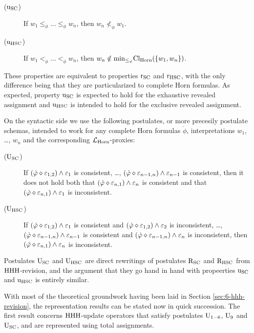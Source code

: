 \begin{description}
	\item[($\mathrm{u}_{{\mathrm{SC}}}$)] If $w_1 \le_{\dot{\phi}}\dots \le_{\dot{\phi}}w_n$,
	then $w_{n}\not<_{\dot{\phi}} w_{1}$.
	\item[($\mathrm{u}_{{\mathrm{HSC}}}$)] If $w_1 <_{\dot{\phi}}\dots <_{\dot{\phi}} w_n$,
	then $w_n\notin{\operatorname{min}}_{\le_{\dot{\varphi}}}{\operatorname{Cl}}_{\mathrm{Horn}}(\{w_1,w_n\})$.
\end{description}

These properties are equivalent to properties $\mathrm{r}_{{\mathrm{SC}}}$ and $\mathrm{r}_{{\mathrm{HSC}}}$,
with the only difference being that they are particularized to complete Horn formulas.
As expected, property $\mathrm{u}_{{\mathrm{SC}}}$ is expected to hold for the exhaustive 
revealed assignment and $\mathrm{u}_{{\mathrm{HSC}}}$ is intended to hold for the exclusive 
revealed assignment.

On the syntactic side 
we use the following postulates,
or more precesily postulate schemas,
intended to work for any complete Horn formulas $\dot{\phi}$,
interpretations $w_1$, \dots, $w_n$
and the corresponding $\mathcal{L}_{\mathrm{Horn}}$-proxies:

\begin{description}
	\item[($\mathrm{U}_{{\mathrm{SC}}}$)]
	If $(\dot{\varphi}\diamond\varepsilon_{1,2})\land\varepsilon_{1}$ is consistent,
		\dots,
		$(\dot{\varphi}\diamond\varepsilon_{n-1,n})\land\varepsilon_{n-1}$ is consistent,
	then it does not hold both that
	$(\dot{\varphi}\diamond\varepsilon_{n,1})\land\varepsilon_{n}$ is consistent
	and that $(\dot{\varphi}\diamond\varepsilon_{n,1})\land\varepsilon_{1}$ is inconsistent.

	\item[($\mathrm{U}_{{\mathrm{HSC}}}$)]
	If 
		$(\dot{\varphi}\diamond\varepsilon_{1,2})\land\varepsilon_{1}$ is consistent and
		$(\dot{\varphi}\diamond\varepsilon_{1,2})\land\varepsilon_{2}$ is inconsistent,
		\dots,
		$(\dot{\varphi}\diamond\varepsilon_{n-1,n})\land\varepsilon_{n-1}$ is consistent and
		$(\dot{\varphi}\diamond\varepsilon_{n-1,n})\land\varepsilon_{n}$ is inconsistent,
	then $(\dot{\varphi}\diamond\varepsilon_{n,1})\land\varepsilon_{n}$ is inconsistent.
\end{description}

Postulates $\mathrm{U}_{{\mathrm{SC}}}$ and $\mathrm{U}_{{\mathrm{HSC}}}$ are direct rewritings of postulates 
$\mathrm{R}_{{\mathrm{SC}}}$ and $\mathrm{R}_{{\mathrm{HSC}}}$ from ${\mathrm{HHH}}$-revision,
and the argument that they go hand in hand with propeerties $\mathrm{u}_{{\mathrm{SC}}}$ and $\mathrm{u}_{{\mathrm{HSC}}}$
is entirely similar.

With most of the theoretical groundwork having been laid in Section \ref{sec:6-hhh-revision},
the representation results can be stated now in quick succession.
The first result concerns ${\mathrm{HHH}}$-update operators that satisfy postulates $\mathrm{U}_{1-6}$, $\mathrm{U}_{9}$
and $\mathrm{U}_{{\mathrm{SC}}}$, and are represented using total assignments.

